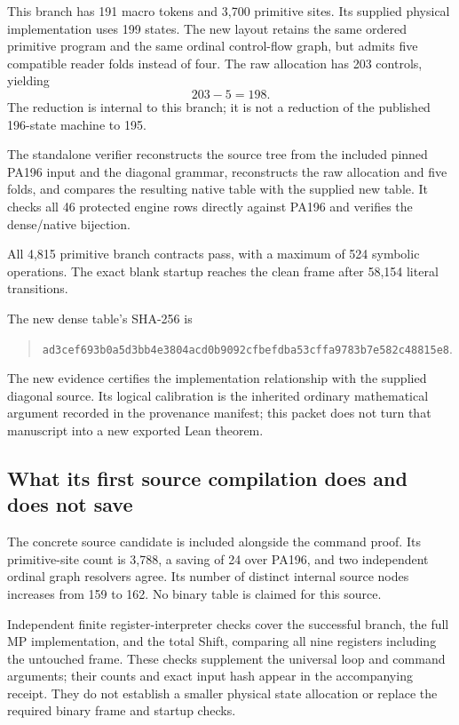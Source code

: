 \documentclass[11pt,letterpaper]{article}
\begin{document}
This branch has 191 macro tokens and 3,700 primitive sites. Its supplied
physical implementation uses 199 states. The new layout retains the
same ordered primitive program and the same ordinal control-flow graph,
but admits five compatible reader folds instead of four. The raw
allocation has 203 controls, yielding
\[
 203-5=198.
\]
The reduction is internal to this branch; it is not a reduction of the
published 196-state machine to 195.

The standalone verifier reconstructs the source tree from the included
pinned PA196 input and the diagonal grammar, reconstructs the raw
allocation and five folds, and compares the resulting native table with
the supplied new table. It checks all 46 protected engine rows directly
against PA196 and verifies the dense/native bijection.

All 4,815 primitive branch contracts pass, with a maximum of 524 symbolic
operations. The exact blank startup reaches the clean frame after
58,154 literal transitions.

\begin{samepage}
The new dense table's SHA-256 is
\begin{quote}\small\nolinkurl{ad3cef693b0a5d3bb4e3804acd0b9092cfbefdba53cffa9783b7e582c48815e8}.\end{quote}\end{samepage}

The new evidence certifies the implementation relationship with the
supplied diagonal source. Its logical calibration is the inherited
ordinary mathematical argument recorded in the provenance manifest;
this packet does not turn that manuscript into a new exported Lean
theorem.



\subsection{What its first source compilation does and does not save}

The concrete source candidate is included alongside the command proof.
Its primitive-site count is 3,788, a saving of 24 over PA196, and two
independent ordinal graph resolvers agree. Its number of distinct
internal source nodes increases from 159 to 162. No binary table is
claimed for this source.

Independent finite register-interpreter checks cover the successful
branch, the full MP implementation, and the total Shift, comparing all
nine registers including the untouched frame. These checks supplement
the universal loop and command arguments; their counts and exact input
hash appear in the accompanying receipt. They do not establish a
smaller physical state allocation or replace the required binary
frame and startup checks.
\end{document}
